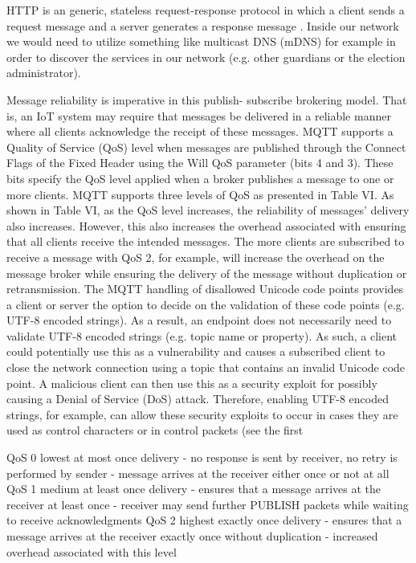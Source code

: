HTTP is an generic, stateless request-response protocol in which a
client sends a request message and a server generates a response message  \cite[8]{protocols}. Inside our network we would need to utilize something like multicast DNS (mDNS) for example in order to discover the services in our network (e.g. other guardians or the election administrator). \cite[20]{protocols}


Message reliability is imperative in this publish-
subscribe brokering model. That is, an IoT system may
require that messages be delivered in a reliable manner
where all clients acknowledge the receipt of these messages.
MQTT supports a Quality of Service (QoS) level when
messages are published through the Connect Flags of the
Fixed Header using the Will QoS parameter (bits 4 and 3).
These bits specify the QoS level applied when a broker
publishes a message to one or more clients. MQTT supports
three levels of QoS as presented in Table VI.
\cite[11]{protocols}
As shown in Table VI, as the QoS level increases, the
reliability of messages’ delivery also increases. However,
this also increases the overhead associated with ensuring that
all clients receive the intended messages. The more clients
are subscribed to receive a message with QoS 2, for example,
will increase the overhead on the message broker while
ensuring the delivery of the message without duplication or
retransmission.
\cite[11]{protocols}
The MQTT handling of disallowed Unicode code points
provides a client or server the option to decide on the
validation of these code points (e.g. UTF-8 encoded strings).
As a result, an endpoint does not necessarily need to validate
UTF-8 encoded strings (e.g. topic name or property). As
such, a client could potentially use this as a vulnerability and
causes a subscribed client to close the network connection
using a topic that contains an invalid Unicode code point. A
malicious client can then use this as a security exploit for
possibly causing a Denial of Service (DoS) attack.
Therefore, enabling UTF-8 encoded strings, for example,
can allow these security exploits to occur in cases they are
used as control characters or in control packets (see the first
\cite[11]{protocols}

QoS 0 lowest
at most once delivery
- no response is sent by receiver, no retry is performed by sender
- message arrives at the receiver either once or not at all
QoS 1 medium
at least once delivery
- ensures that a message arrives at the receiver at least once
- receiver may send further PUBLISH packets while waiting to receive acknowledgments
QoS 2 highest
exactly once delivery
- ensures that a message arrives at the receiver exactly once without duplication
- increased overhead associated with this level
\cite[11]{protocols}

